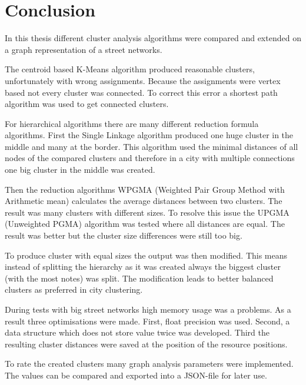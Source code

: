 \chapter{Conclusion}
In this thesis different cluster analysis algorithms were compared and extended on a graph representation of a street networks.

The centroid based K-Means algorithm produced reasonable clusters, unfortunately with wrong assignments. Because the assignments were vertex based not every cluster was connected. To correct this error a shortest path algorithm was used to get connected clusters.

For hierarchical algorithms there are many different reduction formula algorithms. First the Single Linkage algorithm produced one huge cluster in the middle and many at the border. This algorithm used the minimal distances of all nodes of the compared clusters and therefore in a city with multiple connections one big cluster in the middle was created.

Then the reduction algorithms WPGMA (Weighted Pair Group Method with Arithmetic mean) calculates the average distances between two clusters. The result was many clusters with different sizes. To resolve this issue the UPGMA (Unweighted PGMA) algorithm was tested where all distances are equal. The result was better but the cluster size differences were still too big.

To produce cluster with equal sizes the output was then modified. This means instead of splitting the hierarchy as it was created always the biggest cluster (with the most notes) was split. The modification leads to better balanced clusters as preferred in city clustering.

During tests with big street networks high memory usage was a problems. As a result three optimisations were made. First, float precision was used. Second, a data structure which does not store value twice was developed. Third the resulting cluster distances were saved at the position of the resource positions.

To rate the created clusters many graph analysis parameters were implemented. The values can be compared and exported into a JSON-file for later use.